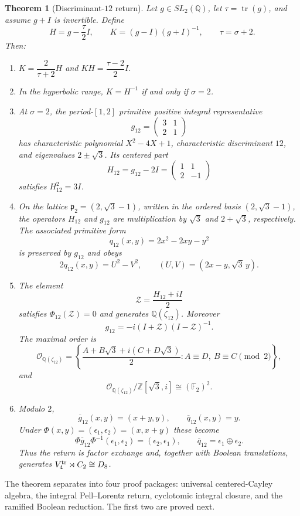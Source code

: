 \documentclass[11pt]{article}
\newtheorem{theorem}{Theorem}[section]
\theoremstyle{definition}
\theoremstyle{remark}
\newcommand{\Q}{\mathbb Q}
\newcommand{\Z}{\mathbb Z}
\newcommand{\F}{\mathbb F}
\newcommand{\OO}{\mathcal O}
\newcommand{\tr}{\operatorname{tr}}
\begin{document}
\begin{theorem}[Discriminant-$12$ return]
\label{thm:main}
Let $g\in SL_2(\Q)$, let $\tau=\tr(g)$, and assume $g+I$ is invertible.
Define
\[
H=g-\frac\tau2I,
\qquad
K=(g-I)(g+I)^{-1},
\qquad
\tau=\sigma+2.
\]
Then:
\begin{enumerate}[label=(\roman*)]
\item $K=\dfrac{2}{\tau+2}H$ and
      $KH=\dfrac{\tau-2}{2}I$.
\item In the hyperbolic range, $K=H^{-1}$ if and only if $\sigma=2$.
\item At $\sigma=2$, the period-$[1,2]$ primitive positive integral
representative
\[
g_{12}=\begin{pmatrix}3&1\\2&1\end{pmatrix}
\]
has characteristic polynomial $X^2-4X+1$, characteristic discriminant $12$,
and eigenvalues $2\pm\sqrt3$.  Its centered part
\[
H_{12}=g_{12}-2I=\begin{pmatrix}1&1\\2&-1\end{pmatrix}
\]
satisfies $H_{12}^2=3I$.
\item On the lattice $\mathfrak p_2=(2,\sqrt3-1)$, written in the ordered
basis $(2,\sqrt3-1)$, the operators $H_{12}$ and $g_{12}$ are multiplication
by $\sqrt3$ and $2+\sqrt3$, respectively.  The associated primitive form
\[
q_{12}(x,y)=2x^2-2xy-y^2
\]
is preserved by $g_{12}$ and obeys
\[
2q_{12}(x,y)=U^2-V^2,
\qquad
(U,V)=(2x-y,\sqrt3\,y).
\]
\item The element
\[
\mathcal Z=\frac{H_{12}+iI}{2}
\]
satisfies $\Phi_{12}(\mathcal Z)=0$ and generates
$\Q(\zeta_{12})$.  Moreover
\[
g_{12}=-i(I+\mathcal Z)(I-\mathcal Z)^{-1}.
\]
The maximal order is
\[
\OO_{\Q(\zeta_{12})}
=\left\{
\frac{A+B\sqrt3+i(C+D\sqrt3)}2:
A\equiv D,\ B\equiv C\pmod2
\right\},
\]
and
\[
\OO_{\Q(\zeta_{12})}/\Z[\sqrt3,i]\cong(\F_2)^2.
\]
\item Modulo $2$,
\[
\overline g_{12}(x,y)=(x+y,y),
\qquad
\overline q_{12}(x,y)=y.
\]
Under $\Phi(x,y)=(\epsilon_1,\epsilon_2)=(x,x+y)$ these become
\[
\Phi\overline g_{12}\Phi^{-1}
(\epsilon_1,\epsilon_2)=(\epsilon_2,\epsilon_1),
\qquad
\overline q_{12}=\epsilon_1\oplus\epsilon_2.
\]
Thus the return is factor exchange and, together with Boolean translations,
generates $V_4^{\rm tr}\rtimes C_2\cong D_8$.
\end{enumerate}
\end{theorem}

The theorem separates into four proof packages: universal centered-Cayley
algebra, the integral Pell--Lorentz return, cyclotomic integral closure, and
the ramified Boolean reduction.  The first two are proved next.
\end{document}
